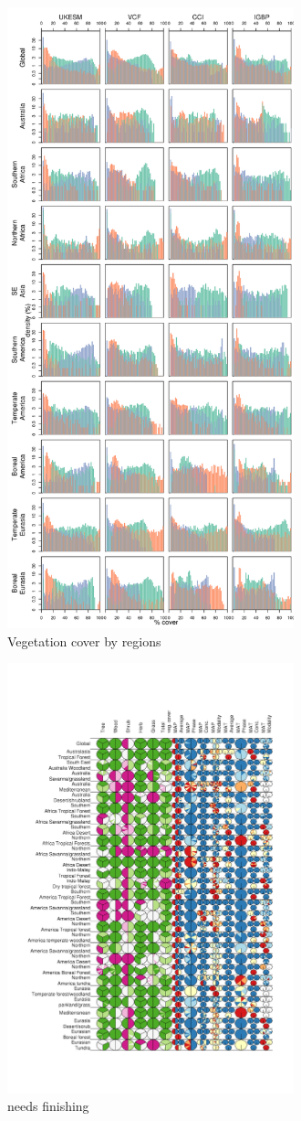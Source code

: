 \documentclass[bg, manuscript]{copernicus}
\begin{document}
\begin{figure}[t]
\includegraphics[width=8.3cm]{figs/VegDist/VegDistHist.png}
\caption{Vegetation cover by regions\label{fig:VegDistHist}}
\end{figure}

\begin{figure}[t]
\includegraphics[width=8.3cm]{figs/scores.png}
\caption{needs finishing\label{fig:scores}}
\end{figure}
\end{document}
